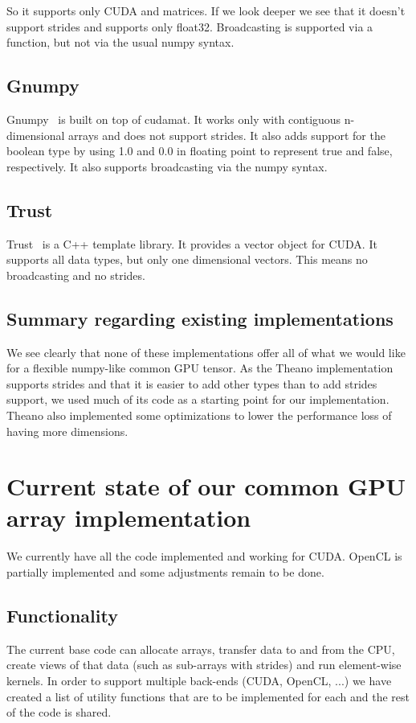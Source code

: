 \documentclass{article} %
\begin{document}
So it supports only CUDA and matrices. 
If we look deeper we see that it doesn't support strides and supports only float32. 
Broadcasting is supported via a function, but not via the usual numpy syntax.

\subsection{Gnumpy}
Gnumpy~\citep{gnumpy-TR2010} is built on top of cudamat.
It works only with contiguous n-dimensional arrays and does not support strides.
It also adds support for the boolean type by using 1.0 and 0.0 in floating point to represent true and false, respectively. 
It also supports broadcasting via the numpy syntax.

\subsection{Trust}
Trust~\citep{Thrust} is a C++ template library.
It provides a vector object for CUDA.
It supports all data types, but only one dimensional vectors.
This means no broadcasting and no strides.

\subsection{Summary regarding existing implementations}
We see clearly that none of these implementations offer all of what we would like for a flexible numpy-like common GPU tensor.
As the Theano implementation supports strides and that it is easier to add other types than to add strides support, we used much of its code as a starting point for our implementation.
Theano also implemented some optimizations to lower the performance loss of having more dimensions.

\section{Current state of our common GPU array implementation}
\label{sec:currentimpl}
We currently have all the code implemented and working for CUDA.
OpenCL is partially implemented and some adjustments remain to be done.

\subsection{Functionality}

The current base code can allocate arrays, transfer data to and from the CPU, create views of that data (such as sub-arrays with strides) and run element-wise kernels.
In order to support multiple back-ends (CUDA, OpenCL, ...) we have created a list of utility functions that are to be implemented for each 
and the rest of the code is shared.
\end{document}

